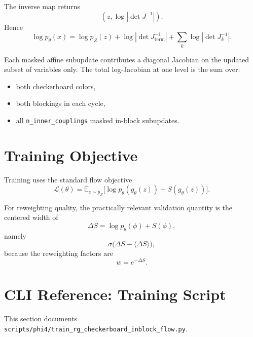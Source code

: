 \documentclass[11pt]{article}
\begin{document}
The inverse map returns
\[
(z,\log|\det J^{-1}|).
\]
Hence
\begin{equation}
\log p_\theta(x)
= \log p_Z(z)
+ \log|\det J_{\mathrm{term}}^{-1}|
+ \sum_k \log|\det J_k^{-1}|.
\end{equation}

Each masked affine subupdate contributes a diagonal Jacobian on the updated
subset of variables only. The total log-Jacobian at one level is the sum over:
\begin{itemize}
\item both checkerboard colors,
\item both blockings in each cycle,
\item all \texttt{n\_inner\_couplings} masked in-block subupdates.
\end{itemize}

\section{Training Objective}

Training uses the standard flow objective
\begin{equation}
\mathcal L(\theta)=
\mathbb E_{z\sim p_Z}
\bigl[
\log p_\theta(g_\theta(z)) + S(g_\theta(z))
\bigr].
\end{equation}

For reweighting quality, the practically relevant validation quantity is the
centered width of
\[
\Delta S = \log p_\theta(\phi) + S(\phi),
\]
namely
\[
\sigma\bigl(\Delta S - \langle\Delta S\rangle\bigr),
\]
because the reweighting factors are
\[
w = e^{-\Delta S}.
\]

\section{CLI Reference: Training Script}

This section documents
\texttt{scripts/phi4/train\_rg\_checkerboard\_inblock\_flow.py}.
\end{document}
